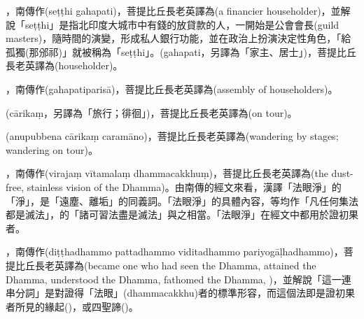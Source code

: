 \startitemgroup[noteitems]
\item{}，南傳作(seṭṭhi gahapati)，菩提比丘長老英譯為(a financier householder)，並解說「seṭṭhi」是指北印度大城市中有錢的放貸款的人，一開始是公會會長(guild masters)，隨時間的演變，形成私人銀行功能，並在政治上扮演決定性角色，「給孤獨(那邠祁)」就被稱為「seṭṭhi」。(gahapati，另譯為「家主、居士」)，菩提比丘長老英譯為(householder)。
\item{}，南傳作(gahapatiparisā)，菩提比丘長老英譯為(assembly of householders)。
\stopitemgroup

\startitemgroup[noteitems]
\item{}(cārikaṃ，另譯為「旅行；徘徊」)，菩提比丘長老英譯為(on tour)。
\item{}(anupubbena cārikaṃ caramāno)，菩提比丘長老英譯為(wandering by stages; wandering on tour)。
\stopitemgroup

\startitemgroup[noteitems]
\item{}，南傳作(virajaṃ vītamalaṃ dhammacakkhuṃ)，菩提比丘長老英譯為(the dust-free, stainless vision of the Dhamma)。由南傳的經文來看，漢譯「法眼淨」的「淨」，是「遠塵、離垢」的同義詞。「法眼淨」的具體內容，等均作「凡任何集法都是滅法」，的「諸可習法盡是滅法」與之相當。「法眼淨」在經文中都用於證初果者。
\stopitemgroup

\startitemgroup[noteitems]
\item{}，南傳作(diṭṭhadhammo pattadhammo viditadhammo pariyogāḷhadhammo)，菩提比丘長老英譯為(became one who had seen the Dhamma, attained the Dhamma, understood the Dhamma, fathomed the Dhamma, )，並解說「這一連串分詞」是對證得「法眼」(dhammacakkhu)者的標準形容，而這個法即是證初果者所見的緣起()，或四聖諦()。
\stopitemgroup


